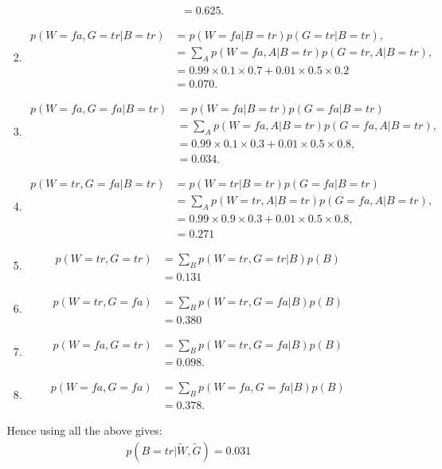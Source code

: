\documentclass[11pt,a4paper,oneside]{report}
\begin{document}
\begin{enumerate}
\begin{enumerate}
\begin{enumerate}
\begin{align}
			&= 0.625.
			\end{align}
			\item
			\begin{align}
			p(W=fa, G=tr|B=tr) &= p(W=fa|B=tr)p(G=tr|B=tr),\\
			&= \sum_{A} p(W=fa, A|B=tr) p(G=tr, A|B=tr),\\
			&= 0.99 \times 0.1 \times 0.7 + 0.01 \times 0.5 \times 0.2\\
			&= 0.070.
			\end{align}
			\item
			\begin{align}
			p(W=fa,G=fa|B=tr)&= p(W=fa|B=tr) p(G=fa|B=tr)\\
			&= \sum_{A} p(W=fa, A|B=tr) p(G=fa, A|B=tr),\\
			&= 0.99\times 0.1 \times 0.3 + 0.01 \times 0.5 \times 0.8,\\
			&= 0.034.
			\end{align}
			\item
			\begin{align}
			p(W=tr,G=fa|B=tr)&= p(W=tr|B=tr) p(G=fa|B=tr)\\
			&= \sum_{A} p(W=tr, A|B=tr) p(G=fa, A|B=tr),\\
			&= 0.99 \times 0.9 \times 0.3 + 0.01 \times 0.5 \times 0.8,\\
			&= 0.271
			\end{align}
			\item
			\begin{align}
			p(W=tr,G=tr)&=\sum_{B} p(W=tr,G=tr|B)p(B) \\
			&=0.131
			\end{align}
			\item
			\begin{align}
			p(W=tr,G=fa)&=\sum_{B} p(W=tr,G=fa|B)p(B) \\
			&= 0.380
			\end{align}
			\item
			\begin{align}
			p(W=fa,G=tr)&= \sum_{B} p(W=tr,G=fa|B)p(B)\\
			&=0.098.
			\end{align}
			\item
			\begin{align}
			p(W=fa,G=fa)&= \sum_{B} p(W=fa, G=fa|B)p(B) \\
			&=0.378.
			\end{align}
		\end{enumerate}
		Hence using all the above gives:
		\begin{align}
		p(B=tr|\tilde{W},\tilde{G}) = 0.031
		\end{align}
	\end{enumerate}
\end{enumerate}
\end{document}
